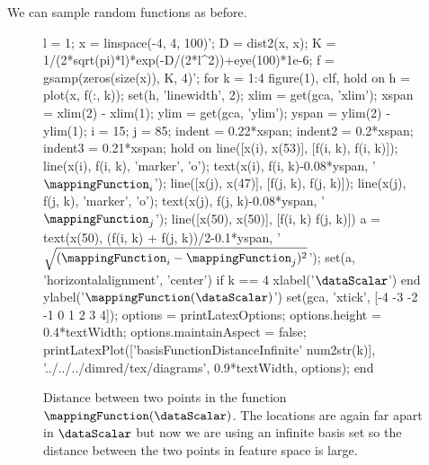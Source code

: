 We can sample random functions as before. 
\begin{figure}
  \begin{matlab}
    l = 1;
    x = linspace(-4, 4, 100)';
    D = dist2(x, x);
    K = 1/(2*sqrt(pi)*l)*exp(-D/(2*l^2))+eye(100)*1e-6;
    f = gsamp(zeros(size(x)), K, 4)';
    for k = 1:4
      figure(1), clf, hold on
      h = plot(x, f(:, k));
      set(h, 'linewidth', 2);
      xlim = get(gca, 'xlim');
      xspan = xlim(2) - xlim(1);
      ylim = get(gca, 'ylim');
      yspan = ylim(2) - ylim(1);
      i = 15; j = 85;
      indent = 0.22*xspan;
      indent2 = 0.2*xspan;
      indent3 = 0.21*xspan;
      hold on
      line([x(i), x(53)], [f(i, k), f(i, k)]);
      line(x(i), f(i, k), 'marker', 'o');
      text(x(i), f(i, k)-0.08*yspan, '$\mappingFunction_i$');
      line([x(j), x(47)], [f(j, k), f(j, k)]);
      line(x(j), f(j, k), 'marker', 'o');
      text(x(j), f(j, k)-0.08*yspan, '$\mappingFunction_j$');
      line([x(50), x(50)], [f(i, k) f(j, k)])
      a = text(x(50), (f(i, k) + f(j, k))/2-0.1*yspan, '$\sqrt{(\mappingFunction_i - \mappingFunction_j)^2}$');
      set(a, 'horizontalalignment', 'center')
      if k == 4
        xlabel('$\dataScalar$')
      end
      ylabel('$\mappingFunction(\dataScalar)$')
      set(gca, 'xtick', [-4 -3 -2 -1 0 1 2 3 4]);
      options = printLatexOptions;
      options.height = 0.4*textWidth; options.maintainAspect = false;
      printLatexPlot(['basisFunctionDistanceInfinite' num2str(k)], '../../../dimred/tex/diagrams', 0.9*textWidth, options);
    end 
  \end{matlab}
  \begin{center}
    
    
    
    
  \end{center}
  \caption{Distance between two points in the function
    $\mappingFunction(\dataScalar)$. The locations are again far apart
    in $\dataScalar$ but now we are using an infinite basis set so the
    distance between the two points in feature space is
    large.} \label{fig:expectedSquareDistanceInfinite}
\end{figure}


